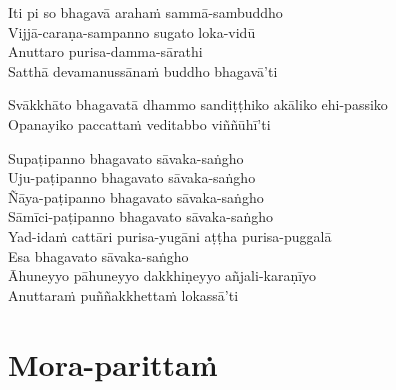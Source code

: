 \begin{paritta}
Iti pi so bhagavā arahaṁ sammā-sambuddho\\
Vijjā-caraṇa-sampanno sugato loka-vidū\\
Anuttaro purisa-damma-sārathi\\
Satthā devamanussānaṁ buddho bhagavā'ti

Svākkhāto bhagavatā dhammo sandiṭṭhiko akāliko ehi-passiko\\
Opanayiko paccattaṁ veditabbo viññūhī'ti

Supaṭipanno bhagavato sāvaka-saṅgho\\
Uju-paṭipanno bhagavato sāvaka-saṅgho\\
Ñāya-paṭipanno bhagavato sāvaka-saṅgho\\
Sāmīci-paṭipanno bhagavato sāvaka-saṅgho\\
Yad-idaṁ cattāri purisa-yugāni aṭṭha purisa-puggalā\\
Esa bhagavato sāvaka-saṅgho\\
Āhuneyyo pāhuneyyo dakkhiṇeyyo añjali-karaṇīyo\\
Anuttaraṁ puññakkhettaṁ lokassā'ti
\end{paritta}

\clearpage

\chapter{Mora-parittaṁ}%


